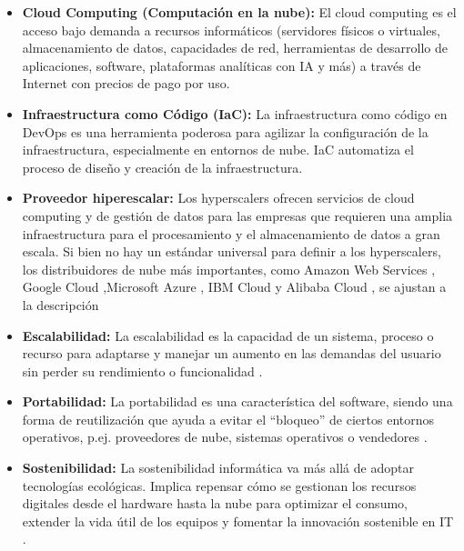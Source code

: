 \documentclass{article}
\begin{document}
{        \begin{itemize}
            \item \textbf{Cloud Computing (Computación en la nube):} El cloud computing es el acceso bajo demanda a recursos informáticos (servidores físicos o virtuales, almacenamiento de datos, capacidades de red, herramientas de desarrollo de aplicaciones, software, plataformas analíticas con IA y más) a través de Internet con precios de pago por uso.
            
            \item \textbf{Infraestructura como Código (IaC):} La infraestructura como código en DevOps es una herramienta poderosa para agilizar la configuración de la infraestructura, especialmente en entornos de nube. IaC automatiza el proceso de diseño y creación de la infraestructura.
            
            \item \textbf{Proveedor hiperescalar:} Los hyperscalers ofrecen servicios de cloud computing y de gestión de datos para las empresas que requieren una amplia infraestructura para el procesamiento y el almacenamiento de datos a gran escala. Si bien no hay un estándar universal para definir a los hyperscalers, los distribuidores de nube más importantes, como Amazon Web Services \cite{noauthor_que_nodate-6}, Google Cloud \cite{noauthor_descripcion_nodate},Microsoft Azure \cite{noauthor_que_nodate-5}, IBM Cloud \cite{noauthor_ibm_nodate} y Alibaba Cloud \cite{noauthor_alibaba_nodate}, se ajustan a la descripción \cite{noauthor_hyperscalers_nodate} 
            
            \item \textbf{Escalabilidad:} La escalabilidad es la capacidad de un sistema, proceso o recurso para adaptarse y manejar un aumento en las demandas del usuario sin perder su rendimiento o funcionalidad \cite{noauthor_escalabilidad_nodate}.
            
            \item \textbf{Portabilidad:} La portabilidad es una característica del software, siendo una forma de reutilización que ayuda a evitar el “bloqueo” de ciertos entornos operativos, p.ej. proveedores de nube, sistemas operativos o vendedores \cite{noauthor_portabilidad_nodate}.

            \item \textbf{Sostenibilidad:} La sostenibilidad informática va más allá de adoptar tecnologías ecológicas. Implica repensar cómo se gestionan los recursos digitales desde el hardware hasta la nube para optimizar el consumo, extender la vida útil de los equipos y fomentar la innovación sostenible en IT \cite{noauthor_que_nodate-3}.
            

\end{itemize}}
\end{document}

